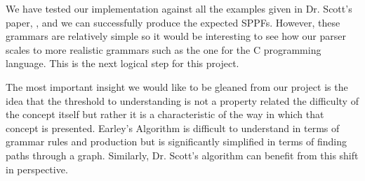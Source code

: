 \documentclass{sigplanconf}
\begin{document}
We have tested our implementation against all the examples given in Dr. Scott's paper, \cite{scott}, and we can successfully produce the expected SPPFs. However, these grammars are relatively simple so it would be interesting to see how our parser scales to more realistic grammars such as the one for the C programming language.  This is the next logical step for this project.

The most important insight we would like to be gleaned from our project is the idea that the threshold to understanding is not a property related the difficulty of the concept itself but rather it is a characteristic of the way in which that concept is presented. Earley's Algorithm is difficult to understand in terms of grammar rules and production but is significantly simplified in terms of  finding paths through a graph. Similarly, Dr. Scott's algorithm can benefit from this shift in perspective.
\end{document}
